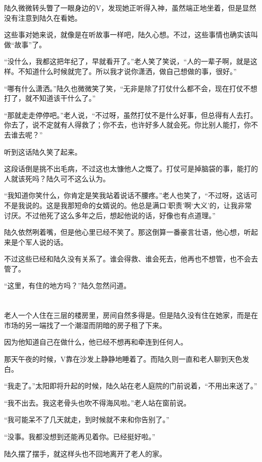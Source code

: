 陆久微微转头瞥了一眼身边的V，发现她正听得入神，虽然端正地坐着，但是显然没有注意到陆久在看她。

这些事对她来说，就像是在听故事一样吧，陆久心想。不过，这些事情也确实该叫做“故事”了。

“没什么，我都这把年纪了，早就看开了。”老人笑了笑说，“人的一辈子啊，就是这样。不知道什么时候就完了。所以我才说你潇洒，做自己想做的事，很好。”

“哪有什么潇洒。”陆久也微微笑了笑，“无非是除了打仗什么都不会，现在打仗不想打了，就不知道该干什么了。”

“那就走走停停吧。”老人说，“不过呀，虽然打仗不是什么好事，但总得有人去打。你去了，说不定就有人得救了；你不去，也许好多人就会死。你比别人能打，你不去谁去呢？”

听到这话陆久笑了起来。

这段话倒是挑不出毛病，不过这也太慷他人之慨了。打仗可是掉脑袋的事，能打的人就该死吗？陆久可不这么认为。

“我知道你笑什么，你肯定是笑我站着说话不腰疼。”老人也笑了，“不过呀，这话可不是我说的。这是我那短命的女婿说的。他总是满口‘职责’啊‘大义’的，让我非常讨厌。不过他死了这么多年之后，想起他说的话，好像也有点道理。”

陆久依然咧着嘴，但是他心里已经不笑了。那这倒算一番豪言壮语，他心想，听起来是个军人说的话。

不过这些已经和陆久没有关系了。谁会得救、谁会死去，他再也不想管，也不会去管了。

“这里，有住的地方吗？”陆久忽然问道。

\section*{}

老人一个人住在三层的楼房里，房间自然多得是。但是陆久没有住在她家，而是在市场的另一端找了一个潮湿而阴暗的房子租了下来。

因为他知道自己在做什么，他已经不想再和牵连到任何人。

那天午夜的时候，V靠在沙发上静静地睡着了。而陆久则一直和老人聊到天色发白。

“我走了。”太阳即将升起的时候，陆久站在老人庭院的门前说着，“不用出来送了。”

“我不出去。我这老骨头也吹不得海风啦。”老人站在窗前说。

“我可能呆不了几天就走，到时候就不来和你告别了。”

“没事。我都没想到还能再见着你。已经挺好啦。”

陆久摆了摆手，就这样头也不回地离开了老人的家。

